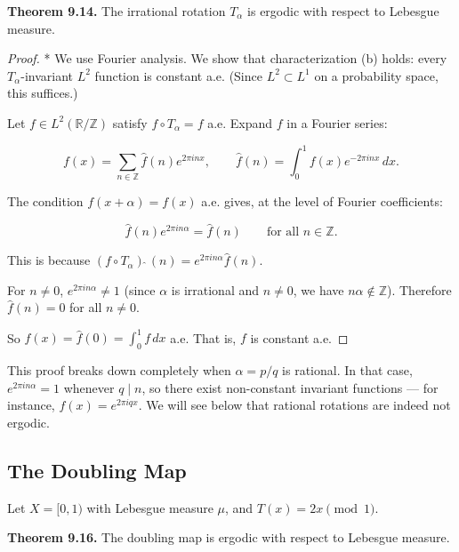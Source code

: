\textbf{Theorem 9.14.} The irrational rotation $T_\alpha$ is ergodic with respect to Lebesgue measure.

\begin{proof}
* We use Fourier analysis. We show that characterization (b) holds: every $T_\alpha$-invariant $L^2$ function is constant a.e. (Since $L^2 \subset L^1$ on a probability space, this suffices.)

Let $f \in L^2(\mathbb{R}/\mathbb{Z})$ satisfy $f \circ T_\alpha = f$ a.e. Expand $f$ in a Fourier series:

\[
f(x) = \sum_{n \in \mathbb{Z}} \hat{f}(n) e^{2\pi i n x}, \qquad \hat{f}(n) = \int_0^1 f(x) e^{-2\pi i n x} \, dx.
\]

The condition $f(x + \alpha) = f(x)$ a.e. gives, at the level of Fourier coefficients:

\[
\hat{f}(n) e^{2\pi i n \alpha} = \hat{f}(n) \qquad \text{for all } n \in \mathbb{Z}.
\]

This is because $(f \circ T_\alpha)\hat{\;}(n) = e^{2\pi i n \alpha} \hat{f}(n)$.

For $n \neq 0$, $e^{2\pi i n \alpha} \neq 1$ (since $\alpha$ is irrational and $n \neq 0$, we have $n\alpha \notin \mathbb{Z}$). Therefore $\hat{f}(n) = 0$ for all $n \neq 0$.

So $f(x) = \hat{f}(0) = \int_0^1 f \, dx$ a.e. That is, $f$ is constant a.e.
\end{proof}


\begin{remark}
This proof breaks down completely when $\alpha = p/q$ is rational. In that case, $e^{2\pi i n \alpha} = 1$ whenever $q \mid n$, so there exist non-constant invariant functions --- for instance, $f(x) = e^{2\pi i q x}$. We will see below that rational rotations are indeed not ergodic.
\end{remark}


\subsection{The Doubling Map}\label{sec:9.7.2}

Let $X = [0, 1)$ with Lebesgue measure $\mu$, and $T(x) = 2x \pmod{1}$.

\textbf{Theorem 9.16.} The doubling map is ergodic with respect to Lebesgue measure.

